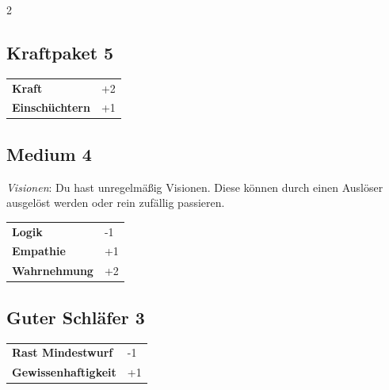\begin{multicols}{2}
\begin{tcolorbox}
    \subsection*{Kraftpaket \hfill \small{5 }}
    \tcblower




\begin{tabular}{@{}ll@{}}
    \textbf{Kraft} & +2\\
    \textbf{Einschüchtern} & +1\\
\end{tabular}


\end{tcolorbox}

\begin{tcolorbox}
    \subsection*{Medium \hfill \small{4 }}
    \tcblower
\textit{Visionen}: Du hast unregelmäßig Visionen. Diese können durch einen Auslöser ausgelöst werden oder rein zufällig passieren.


\vspace{3mm}

\begin{tabular}{@{}ll@{}}
    \textbf{Logik} & -1\\
    \textbf{Empathie} & +1\\
    \textbf{Wahrnehmung} & +2\\
\end{tabular}


\end{tcolorbox}

\begin{tcolorbox}
    \subsection*{Guter Schläfer \hfill \small{3 }}
    \tcblower




\begin{tabular}{@{}ll@{}}
    \textbf{Rast Mindestwurf} & -1\\
    \textbf{Gewissenhaftigkeit} & +1\\
\end{tabular}


\end{tcolorbox}
\end{multicols}
